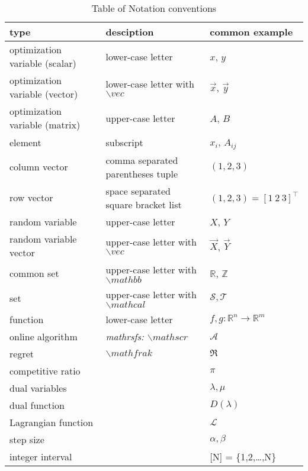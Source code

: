 \documentclass[preview]{standalone}
\begin{document}
    
\begin{table} \footnotesize  
    \caption{Table of Notation conventions}
    \begin{tabularx}{\linewidth}{lll}
    \hline
    type & desciption & common example \\ \hline \hline
    optimization variable (scalar) & lower-case letter & $x$, $y$ \\
    optimization variable (vector) & lower-case letter with $\backslash vec$ & $\vec{x}$, $\vec{y}$ \\
    optimization variable (matrix) & upper-case letter & ${A}$, ${B}$ \\
    element & subscript & ${x}_i$, ${A}_{ij}$ \\
    column vector & comma separated parentheses tuple &  $(1,2,3)$\\
    row vector & space separated square bracket list &  $(1,2,3) = [1\ 2\ 3]^{\top}$\\
    random variable & upper-case letter & $X$, $Y$ \\
    random variable vector & upper-case letter with $\backslash vec$ & $\vec{X}$, $\vec{Y}$ \\
    common set & upper-case letter with $\backslash mathbb$ & $\mathbb{R}$, $\mathbb{Z}$ \\
    set & upper-case letter with $\backslash mathcal$ & $\mathcal{S}, \mathcal{T} $ \\
    function & lower-case letter & $f,g:\mathbb{R}^n \rightarrow \mathbb{R}^m$ \\
    \hline \hline
    online algorithm & \emph{mathrsfs: $\backslash mathscr$ }  & $\mathscr{A}$ \\
    regret & $\backslash mathfrak$ & $\mathfrak{R}$ \\
    competitive ratio && $\pi$ \\
    dual variables && $\lambda, \mu $ \\
    dual function && $D(\lambda)$ \\
    Lagrangian function && $\mathcal{L}$ \\
    step size && $\alpha,\beta$ \\
    integer interval & & [N] = \{1,2,\dots,N\} \\
    \hline \hline
    \end{tabularx}
\end{table}
\end{document}
